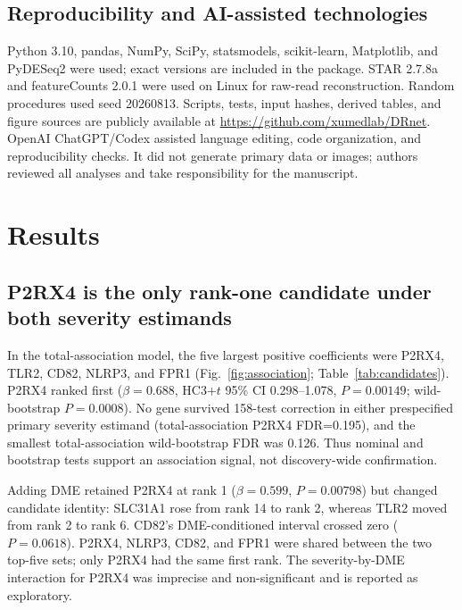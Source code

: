 \documentclass[12pt]{article}
\begin{document}
\subsection{Reproducibility and AI-assisted technologies}

Python 3.10, pandas, NumPy, SciPy, statsmodels, scikit-learn, Matplotlib, and PyDESeq2 were used; exact versions are included in the package. STAR 2.7.8a and featureCounts 2.0.1 were used on Linux for raw-read reconstruction. Random procedures used seed 20260813. Scripts, tests, input hashes, derived tables, and figure sources are publicly available at \url{https://github.com/xumedlab/DRnet}. OpenAI ChatGPT/Codex assisted language editing, code organization, and reproducibility checks. It did not generate primary data or images; authors reviewed all analyses and take responsibility for the manuscript.

\section{Results}

\subsection{P2RX4 is the only rank-one candidate under both severity estimands}

In the total-association model, the five largest positive coefficients were P2RX4, TLR2, CD82, NLRP3, and FPR1 (Fig.~\ref{fig:association}; Table~\ref{tab:candidates}). P2RX4 ranked first ($\beta=0.688$, HC3+$t$ 95\% CI 0.298--1.078, $P=0.00149$; wild-bootstrap $P=0.0008$). No gene survived 158-test correction in either prespecified primary severity estimand (total-association P2RX4 FDR=0.195), and the smallest total-association wild-bootstrap FDR was 0.126. Thus nominal and bootstrap tests support an association signal, not discovery-wide confirmation.

Adding DME retained P2RX4 at rank 1 ($\beta=0.599$, $P=0.00798$) but changed candidate identity: SLC31A1 rose from rank 14 to rank 2, whereas TLR2 moved from rank 2 to rank 6. CD82's DME-conditioned interval crossed zero ($P=0.0618$). P2RX4, NLRP3, CD82, and FPR1 were shared between the two top-five sets; only P2RX4 had the same first rank. The severity-by-DME interaction for P2RX4 was imprecise and non-significant and is reported as exploratory.
\end{document}
